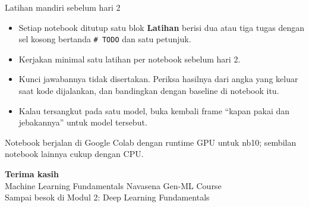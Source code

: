 \documentclass[aspectratio=169,t]{beamer}
\begin{document}
\begin{frame}{Latihan mandiri sebelum hari 2}
  \vspace{0.6em}
  \begin{itemize}\setlength\itemsep{0.55em}
    \item Setiap notebook ditutup satu blok \textbf{Latihan} berisi dua atau tiga tugas dengan
          sel kosong bertanda \texttt{\# TODO} dan satu petunjuk.
    \item Kerjakan minimal satu latihan per notebook sebelum hari 2.
    \item Kunci jawabannya tidak disertakan. Periksa hasilnya dari angka yang keluar saat kode
          dijalankan, dan bandingkan dengan baseline di notebook itu.
    \item Kalau tersangkut pada satu model, buka kembali frame ``kapan pakai dan jebakannya''
          untuk model tersebut.
  \end{itemize}
  \vspace{0.7em}
  {\footnotesize\color{nvgray}Notebook berjalan di Google Colab dengan runtime GPU untuk nb10;
  sembilan notebook lainnya cukup dengan CPU.}
\end{frame}

\begin{frame}[plain]
  \begin{center}
    \vspace{2.3cm}
    {\Huge\bfseries\color{nvgreen}Terima kasih}\\[1em]
    {\large\color{nvwhite}Machine Learning Fundamentals \textperiodcentered{} Navasena Gen-ML Course}\\[0.6em]
    {\normalsize\color{nvgray}Sampai besok di Modul 2: Deep Learning Fundamentals}
  \end{center}
\end{frame}
\end{document}
